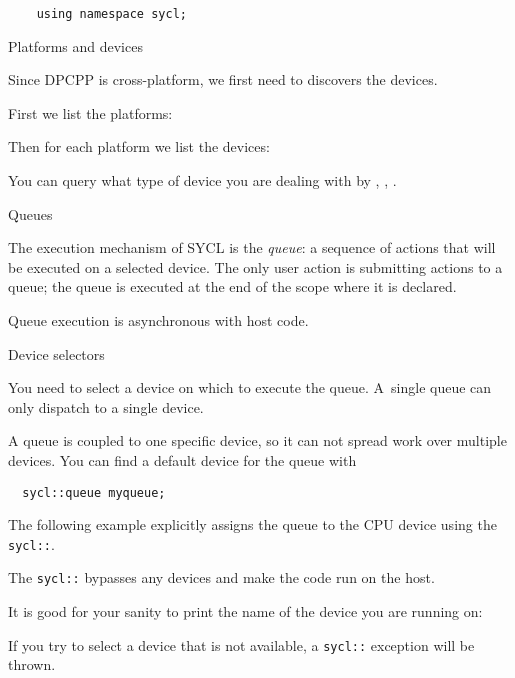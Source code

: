 \begin{dpcppnote}
  \begin{lstlisting}
    using namespace sycl;
  \end{lstlisting}
\end{dpcppnote}

 {Platforms and devices}

Since \ac{DPCPP} is cross-platform, we first need to discovers
the devices.

First we list the platforms:

Then for each platform we list the devices:

You can query what type of device you are dealing with by
, , .

 {Queues}

The execution mechanism of SYCL is the
\emph{queue}:
a sequence of actions that will be executed on a selected device.
The only user action is submitting actions to a queue;
the queue is executed at the end of the scope where it is declared.

Queue execution is asynchronous with host code.

 {Device selectors}

You need to select a device on which to execute the queue.
A~single queue can only dispatch to a single device.

A queue is coupled to one specific device,
so it can not spread work over multiple devices.
You can find a default device for the queue with
\begin{lstlisting}
  sycl::queue myqueue;
\end{lstlisting}

The following example explicitly assigns the queue to the CPU device
using the \lstinline+sycl::+.

The \lstinline+sycl::+ bypasses any devices and
make the code run on the host.

It is good for your sanity to print the name of the device
you are running on:

If you try to select a device that is not available,
a \lstinline+sycl::+ exception will be thrown.

